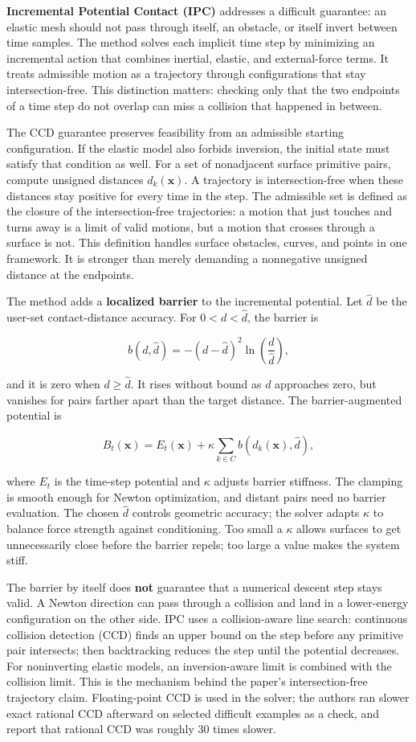 \textbf{Incremental Potential Contact (IPC)} addresses a difficult guarantee: an elastic mesh should not pass through itself, an obstacle, or itself invert between time samples. The method solves each implicit time step by minimizing an incremental action that combines inertial, elastic, and external-force terms. It treats admissible motion as a trajectory through configurations that stay intersection-free. This distinction matters: checking only that the two endpoints of a time step do not overlap can miss a collision that happened in between.

The CCD guarantee preserves feasibility from an admissible starting configuration. If the elastic model also forbids inversion, the initial state must satisfy that condition as well. For a set of nonadjacent surface primitive pairs, compute unsigned distances \(d_k(\mathbf{x})\). A trajectory is intersection-free when these distances stay positive for every time in the step. The admissible set is defined as the closure of the intersection-free trajectories: a motion that just touches and turns away is a limit of valid motions, but a motion that crosses through a surface is not. This definition handles surface obstacles, curves, and points in one framework. It is stronger than merely demanding a nonnegative unsigned distance at the endpoints.

The method adds a \textbf{localized barrier} to the incremental potential. Let \(\widehat d\) be the user-set contact-distance accuracy. For \(0<d<\widehat d\), the barrier is

\[b(d,\widehat d)=-(d-\widehat d)^2\ln\left(\frac{d}{\widehat d}\right),\]

and it is zero when \(d\ge\widehat d\). It rises without bound as \(d\) approaches zero, but vanishes for pairs farther apart than the target distance. The barrier-augmented potential is

\[B_t(\mathbf{x})=E_t(\mathbf{x})+\kappa\sum_{k\in C}b(d_k(\mathbf{x}),\widehat d),\]

where \(E_t\) is the time-step potential and \(\kappa\) adjusts barrier stiffness. The clamping is smooth enough for Newton optimization, and distant pairs need no barrier evaluation. The chosen \(\widehat d\) controls geometric accuracy; the solver adapts \(\kappa\) to balance force strength against conditioning. Too small a \(\kappa\) allows surfaces to get unnecessarily close before the barrier repels; too large a value makes the system stiff.

The barrier by itself does \textbf{not} guarantee that a numerical descent step stays valid. A Newton direction can pass through a collision and land in a lower-energy configuration on the other side. IPC uses a collision-aware line search: continuous collision detection (CCD) finds an upper bound on the step before any primitive pair intersects; then backtracking reduces the step until the potential decreases. For noninverting elastic models, an inversion-aware limit is combined with the collision limit. This is the mechanism behind the paper's intersection-free trajectory claim. Floating-point CCD is used in the solver; the authors ran slower exact rational CCD afterward on selected difficult examples as a check, and report that rational CCD was roughly 30 times slower.

